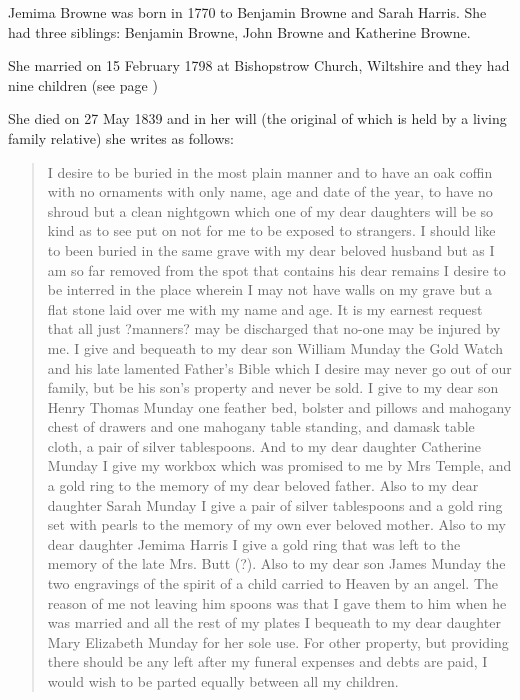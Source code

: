
Jemima Browne was born in	1770 to Benjamin Browne and Sarah Harris. She had three siblings: Benjamin Browne, John Browne and Katherine Browne.

She married  on 15 February 1798 at Bishopstrow Church, Wiltshire and they had nine children (see page \pageref{James_Munday})

She died on 27 May 1839 and in her will (the original of which is held by a living family relative) she writes as follows:

\begin{quotation}
I desire to be buried in the most plain manner and to have an oak coffin with no ornaments with only name, age and date of the year, to have no shroud but a clean nightgown which one of my dear daughters will be so kind as to see put on not for me to be exposed to strangers. I should like to been buried in the same grave with my dear beloved husband but as I am so far removed from the spot that contains his dear remains I desire to be interred in the place wherein I may not have walls on my grave but a flat stone laid over me with my name and age. It is my earnest request that all just ?manners? may be discharged that no-one may be injured by me. I give and bequeath to my dear son William Munday the Gold Watch and his late lamented Father's Bible which I desire may never go out of our family, but be his son's property and never be sold. I give to my dear son Henry Thomas Munday one feather bed, bolster and pillows and mahogany chest of drawers and one mahogany table standing, and damask table cloth, a pair of silver tablespoons. And to my dear daughter Catherine Munday I give my workbox which was promised to me by Mrs Temple, and a gold ring to the memory of my dear beloved father. Also to my dear daughter Sarah Munday I give a pair of silver tablespoons and a gold ring set with pearls to the memory of my own ever beloved mother. Also to my dear daughter Jemima Harris I give a gold ring that was left to the memory of the late Mrs. Butt (?). Also to my dear son James Munday the two engravings of the spirit of a child carried to Heaven by an angel. The reason of me not leaving him spoons was that I gave them to him when he was married and all the rest of my plates I bequeath to my dear daughter Mary Elizabeth Munday for her sole use. For other property, but providing there should be any left after my funeral expenses and debts are paid, I would wish to be parted equally between all my children.
\end{quotation}
